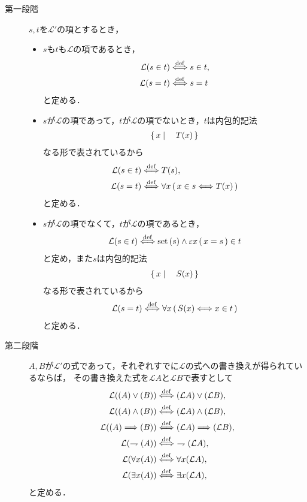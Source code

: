 	\begin{description}
		\item[第一段階] $s,t$を$\mathcal{L}'$の項とするとき，
			\begin{itemize}
				\item $s$も$t$も$\mathcal{L}$の項であるとき，
					\begin{align}
						\mathcal{L}(s \in t) &\overset{\mathrm{def}}{\Longleftrightarrow} s \in t, \\
						\mathcal{L}(s = t) &\overset{\mathrm{def}}{\Longleftrightarrow} s = t
					\end{align}
					と定める．
					
				\item $s$が$\mathcal{L}$の項であって，$t$が$\mathcal{L}$の項でないとき，$t$は内包的記法
					\begin{align}
						\left\{\, x \mid \quad T(x)\, \right\}
					\end{align}
					なる形で表されているから
					\begin{align}
						\mathcal{L}(s \in t) &\overset{\mathrm{def}}{\Longleftrightarrow} T(s), \\
						\mathcal{L}(s = t) &\overset{\mathrm{def}}{\Longleftrightarrow} \forall x\, (\, x \in s \Longleftrightarrow T(x)\, )
					\end{align}
					と定める．
					
				\item $s$が$\mathcal{L}$の項でなくて，$t$が$\mathcal{L}$の項であるとき，
					\begin{align}
						\mathcal{L}(s \in t) \overset{\mathrm{def}}{\Longleftrightarrow} \operatorname*{set} \left(s\right) \wedge \varepsilon x\, (\, x = s\, ) \in t
					\end{align}
					と定め，また$s$は内包的記法
					\begin{align}
						\left\{\, x \mid \quad S(x)\, \right\}
					\end{align}
					なる形で表されているから
					\begin{align}
						\mathcal{L}(s = t) \overset{\mathrm{def}}{\Longleftrightarrow} \forall x\, (\, S(x) \Longleftrightarrow x \in t\, )
					\end{align}
					と定める．
			\end{itemize}
		
		\item[第二段階] $A,B$が$\mathcal{L}'$の式であって，それぞれすでに$\mathcal{L}$の式への書き換えが得られているならば，
			その書き換えた式を$\mathcal{L}A$と$\mathcal{L}B$で表すとして
			\begin{align}
				\mathcal{L}((A) \vee (B)) &\defarrow (\mathcal{L}A) \vee (\mathcal{L}B), \\
				\mathcal{L}((A) \wedge (B)) &\defarrow (\mathcal{L}A) \wedge (\mathcal{L}B), \\
				\mathcal{L}((A) \Longrightarrow (B)) &\defarrow (\mathcal{L}A) \Longrightarrow (\mathcal{L}B), \\
				\mathcal{L}(\rightharpoondown (A)) &\defarrow\ \rightharpoondown (\mathcal{L}A), \\
				\mathcal{L}(\forall x (A)) &\defarrow \forall x (\mathcal{L}A), \\
				\mathcal{L}(\exists x (A)) &\defarrow \exists x (\mathcal{L}A), \\
			\end{align}
			と定める．
	\end{description}
	
